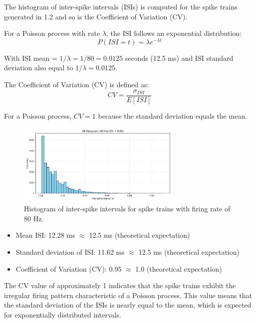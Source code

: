 \documentclass{article}
\begin{document}
The histogram of inter-spike intervals (ISIs) is computed for the spike trains generated in 1.2 and so is the Coefficient of Variation (CV).

For a Poisson process with rate $\lambda$, the ISI follows an exponential distribution:
\begin{equation}
    P(ISI = t) = \lambda e^{-\lambda t}
\end{equation}

With ISI mean = $1/\lambda = 1/80 = 0.0125$ seconds (12.5 ms) and ISI standard deviation also equal to $1/\lambda = 0.0125$.

The Coefficient of Variation (CV) is defined as:
\begin{equation}
    CV = \frac{\sigma_{ISI}}{E[ISI]}
\end{equation}

For a Poisson process, $CV = 1$ because the standard deviation equals the mean.

\begin{figure}[H]
\centering
\includegraphics[width=0.7\textwidth]{Fig3.png}
\caption{Histogram of inter-spike intervals for spike trains with firing rate of 80 Hz.}
\label{fig:isi_hist}
\end{figure}

\begin{itemize}
    \item Mean ISI: 12.28 ms $\approx$ 12.5 ms (theoretical expectation)
    \item Standard deviation of ISI: 11.62 ms $\approx$ 12.5 ms (theoretical expectation)
    \item Coefficient of Variation (CV): 0.95 $\approx$ 1.0 (theoretical expectation)
\end{itemize}

The CV value of approximately 1 indicates that the spike trains exhibit the irregular firing pattern characteristic of a Poisson process. 
This value means that the standard deviation of the ISIs is nearly equal to the mean, which is expected for exponentially distributed intervals. 
\end{document}
